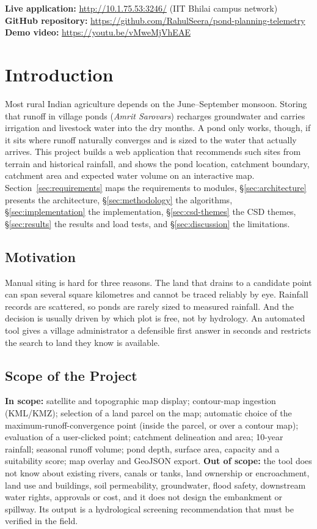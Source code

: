 \documentclass[manuscript,screen,review]{acmart}
\begin{document}
\noindent\textbf{Live application:} \url{http://10.1.75.53:3246/} (IIT Bhilai campus network)\\[0.3em]
\noindent\textbf{GitHub repository:} \url{https://github.com/RahulSeera/pond-planning-telemetry}\\[0.3em]
\noindent\textbf{Demo video:} \url{https://youtu.be/vMweMjVhEAE}

\section{Introduction}
\label{sec:intro}
Most rural Indian agriculture depends on the June--September monsoon. Storing that runoff in village ponds (\textit{Amrit Sarovars}) recharges groundwater and carries irrigation and livestock water into the dry months. A pond only works, though, if it sits where runoff naturally converges and is sized to the water that actually arrives. This project builds a web application that recommends such sites from terrain and historical rainfall, and shows the pond location, catchment boundary, catchment area and expected water volume on an interactive map. Section~\ref{sec:requirements} maps the requirements to modules, \S\ref{sec:architecture} presents the architecture, \S\ref{sec:methodology} the algorithms, \S\ref{sec:implementation} the implementation, \S\ref{sec:csd-themes} the CSD themes, \S\ref{sec:results} the results and load tests, and \S\ref{sec:discussion} the limitations.

\subsection{Motivation}
Manual siting is hard for three reasons. The land that drains to a candidate point can span several square kilometres and cannot be traced reliably by eye. Rainfall records are scattered, so ponds are rarely sized to measured rainfall. And the decision is usually driven by which plot is free, not by hydrology. An automated tool gives a village administrator a defensible first answer in seconds and restricts the search to land they know is available.

\subsection{Scope of the Project}
\textbf{In scope:} satellite and topographic map display; contour-map ingestion (KML/KMZ); selection of a land parcel on the map; automatic choice of the maximum-runoff-convergence point (inside the parcel, or over a contour map); evaluation of a user-clicked point; catchment delineation and area; 10-year rainfall; seasonal runoff volume; pond depth, surface area, capacity and a suitability score; map overlay and GeoJSON export.
\textbf{Out of scope:} the tool does not know about existing rivers, canals or tanks, land ownership or encroachment, land use and buildings, soil permeability, groundwater, flood safety, downstream water rights, approvals or cost, and it does not design the embankment or spillway. Its output is a hydrological screening recommendation that must be verified in the field.
\end{document}
